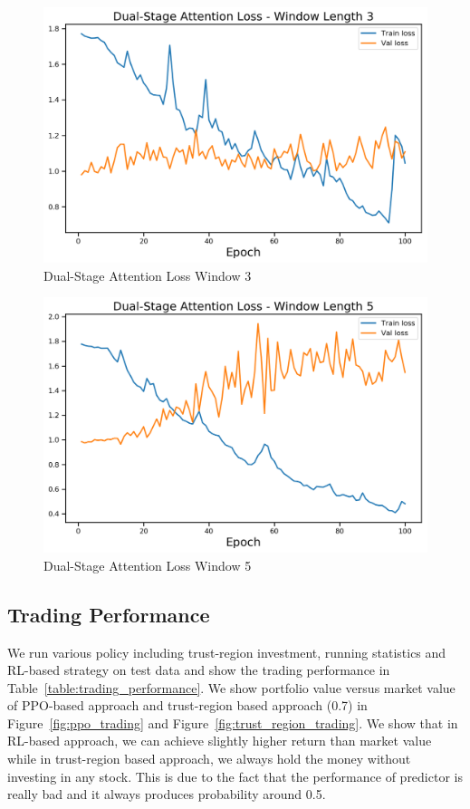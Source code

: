 \documentclass[11pt,a4paper]{article}
\begin{document}
\begin{figure}
  \centering
  \includegraphics[width=\linewidth]{dual_attention_window_3}
  \caption{Dual-Stage Attention Loss Window 3}
  \label{fig:dual_attention_window_3}
\end{figure}

\begin{figure}
  \centering
  \includegraphics[width=\linewidth]{dual_attention_window_5}
  \caption{Dual-Stage Attention Loss Window 5}
  \label{fig:dual_attention_window_5}
\end{figure}


\subsection{Trading Performance}
We run various policy including trust-region investment, running statistics and RL-based strategy on test data and show the trading performance in Table~\ref{table:trading_performance}. We show portfolio value versus market value of PPO-based approach and trust-region based approach (0.7) in Figure~\ref{fig:ppo_trading} and Figure~\ref{fig:trust_region_trading}. We show that in RL-based approach, we can achieve slightly higher return than market value while in trust-region based approach, we always hold the money without investing in any stock. This is due to the fact that the performance of predictor is really bad and it always produces probability around 0.5.
\end{document}
